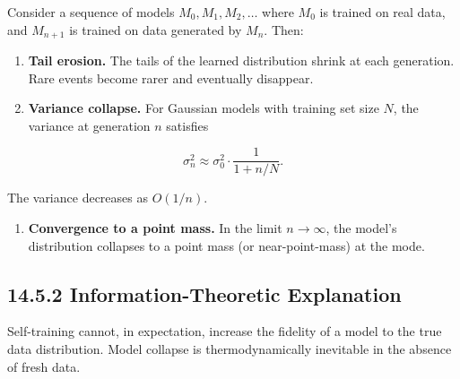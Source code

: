 \begin{theorem}[Shumailov et al., 2024]
Consider a sequence of models $M_0, M_1, M_2, \ldots$ where $M_0$ is trained on real data, and $M_{n+1}$ is trained on data generated by $M_n$. Then:
\end{theorem}
\begin{enumerate}
  \item \textbf{Tail erosion.} The tails of the learned distribution shrink at each generation. Rare events become rarer and eventually disappear.
  \item \textbf{Variance collapse.} For Gaussian models with training set size $N$, the variance at generation $n$ satisfies
\end{enumerate}

\[
\sigma_n^2 \approx \sigma_0^2 \cdot \frac{1}{1 + n/N}.
\]

The variance decreases as $O(1/n)$.

\begin{enumerate}
  \item \textbf{Convergence to a point mass.} In the limit $n \to \infty$, the model's distribution collapses to a point mass (or near-point-mass) at the mode.
\end{enumerate}

\subsection{14.5.2 Information-Theoretic Explanation}


\begin{corollary}
Self-training cannot, in expectation, increase the fidelity of a model to the true data distribution. Model collapse is thermodynamically inevitable in the absence of fresh data.
\end{corollary}

